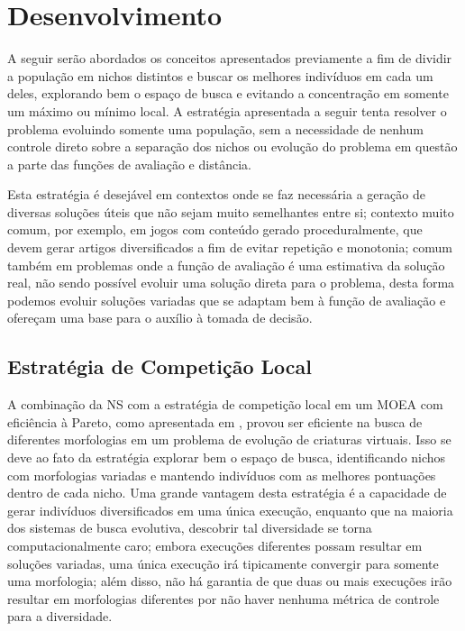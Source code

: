 \chapter{Desenvolvimento}
\label{Desenvolvimento}

A seguir serão abordados os conceitos apresentados previamente a fim de dividir a população em nichos distintos e buscar os melhores indivíduos em cada um deles, explorando bem o espaço de busca e evitando a concentração em somente um máximo ou mínimo local. A estratégia apresentada a seguir tenta resolver o problema evoluindo somente uma população, sem a necessidade de nenhum controle direto sobre a separação dos nichos ou evolução do problema em questão a parte das funções de avaliação e distância.

Esta estratégia é desejável em contextos onde se faz necessária a geração de diversas soluções úteis que não sejam muito semelhantes entre si; contexto muito comum, por exemplo, em jogos com conteúdo gerado proceduralmente, que devem gerar artigos diversificados a fim de evitar repetição e monotonia; comum também em problemas onde a função de avaliação é uma estimativa da solução real, não sendo possível evoluir uma solução direta para o problema, desta forma podemos evoluir soluções variadas que se adaptam bem à função de avaliação e ofereçam uma base para o auxílio à tomada de decisão.

\section{Estratégia de Competição Local}
\label{dev_competicao_local}

A combinação da NS com a estratégia de competição local em um MOEA com eficiência à Pareto, como apresentada em \cite{lehman2011evolving}, provou ser eficiente na busca de diferentes morfologias em um problema de evolução de criaturas virtuais. Isso se deve ao fato da estratégia explorar bem o espaço de busca, identificando nichos com morfologias variadas e mantendo indivíduos com as melhores pontuações dentro de cada nicho. Uma grande vantagem desta estratégia é a capacidade de gerar indivíduos diversificados em uma única execução, enquanto que na maioria dos sistemas de busca evolutiva, descobrir tal diversidade se torna computacionalmente caro; embora execuções diferentes possam resultar em soluções variadas, uma única execução irá tipicamente convergir para somente uma morfologia; além disso, não há garantia de que duas ou mais execuções irão resultar em morfologias diferentes por não haver nenhuma métrica de controle para a diversidade.

